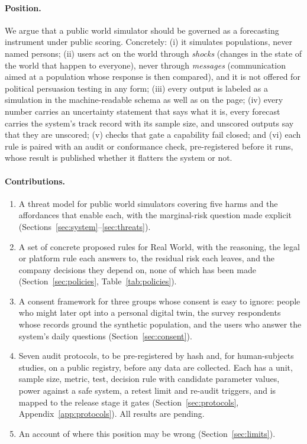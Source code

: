 \documentclass[11pt]{article}
\begin{document}
\paragraph{Position.} We argue that a public world simulator should be governed as a forecasting instrument under public scoring. Concretely: (i) it simulates populations, never named persons; (ii) users act on the world through \emph{shocks} (changes in the state of the world that happen to everyone), never through \emph{messages} (communication aimed at a population whose response is then compared), and it is not offered for political persuasion testing in any form; (iii) every output is labeled as a simulation in the machine-readable schema as well as on the page; (iv) every number carries an uncertainty statement that says what it is, every forecast carries the system's track record with its sample size, and unscored outputs say that they are unscored; (v) checks that gate a capability fail closed; and (vi) each rule is paired with an audit or conformance check, pre-registered before it runs, whose result is published whether it flatters the system or not.

\paragraph{Contributions.}
\begin{enumerate}
  \item A threat model for public world simulators covering five harms and the affordances that enable each, with the marginal-risk question made explicit (Sections~\ref{sec:system}--\ref{sec:threats}).
  \item A set of concrete proposed rules for Real World, with the reasoning, the legal or platform rule each answers to, the residual risk each leaves, and the company decisions they depend on, none of which has been made (Section~\ref{sec:policies}, Table~\ref{tab:policies}).
  \item A consent framework for three groups whose consent is easy to ignore: people who might later opt into a personal digital twin, the survey respondents whose records ground the synthetic population, and the users who answer the system's daily questions (Section~\ref{sec:consent}).
  \item Seven audit protocols, to be pre-registered by hash and, for human-subjects studies, on a public registry, before any data are collected. Each has a unit, sample size, metric, test, decision rule with candidate parameter values, power against a safe system, a retest limit and re-audit triggers, and is mapped to the release stage it gates (Section~\ref{sec:protocols}, Appendix~\ref{app:protocols}). All results are pending.
  \item An account of where this position may be wrong (Section~\ref{sec:limits}).
\end{enumerate}
\end{document}
